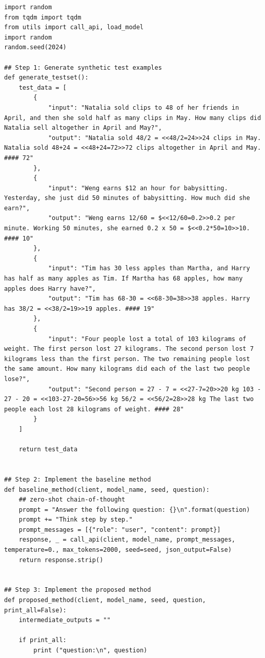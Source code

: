 \begin{lstlisting}
import random 
from tqdm import tqdm 
from utils import call_api, load_model
import random
random.seed(2024)

## Step 1: Generate synthetic test examples
def generate_testset():
    test_data = [
        {
            "input": "Natalia sold clips to 48 of her friends in April, and then she sold half as many clips in May. How many clips did Natalia sell altogether in April and May?",
            "output": "Natalia sold 48/2 = <<48/2=24>>24 clips in May. Natalia sold 48+24 = <<48+24=72>>72 clips altogether in April and May. #### 72"
        },
        {
            "input": "Weng earns $12 an hour for babysitting. Yesterday, she just did 50 minutes of babysitting. How much did she earn?",
            "output": "Weng earns 12/60 = $<<12/60=0.2>>0.2 per minute. Working 50 minutes, she earned 0.2 x 50 = $<<0.2*50=10>>10. #### 10"
        },
        {
            "input": "Tim has 30 less apples than Martha, and Harry has half as many apples as Tim. If Martha has 68 apples, how many apples does Harry have?",
            "output": "Tim has 68-30 = <<68-30=38>>38 apples. Harry has 38/2 = <<38/2=19>>19 apples. #### 19"
        },
        {
            "input": "Four people lost a total of 103 kilograms of weight. The first person lost 27 kilograms. The second person lost 7 kilograms less than the first person. The two remaining people lost the same amount. How many kilograms did each of the last two people lose?",
            "output": "Second person = 27 - 7 = <<27-7=20>>20 kg 103 - 27 - 20 = <<103-27-20=56>>56 kg 56/2 = <<56/2=28>>28 kg The last two people each lost 28 kilograms of weight. #### 28"
        }
    ]

    return test_data


## Step 2: Implement the baseline method 
def baseline_method(client, model_name, seed, question):
    ## zero-shot chain-of-thought
    prompt = "Answer the following question: {}\n".format(question)
    prompt += "Think step by step."
    prompt_messages = [{"role": "user", "content": prompt}]
    response, _ = call_api(client, model_name, prompt_messages, temperature=0., max_tokens=2000, seed=seed, json_output=False)
    return response.strip()


## Step 3: Implement the proposed method 
def proposed_method(client, model_name, seed, question, print_all=False):
    intermediate_outputs = "" 
    
    if print_all:
        print ("question:\n", question)


\end{lstlisting}

